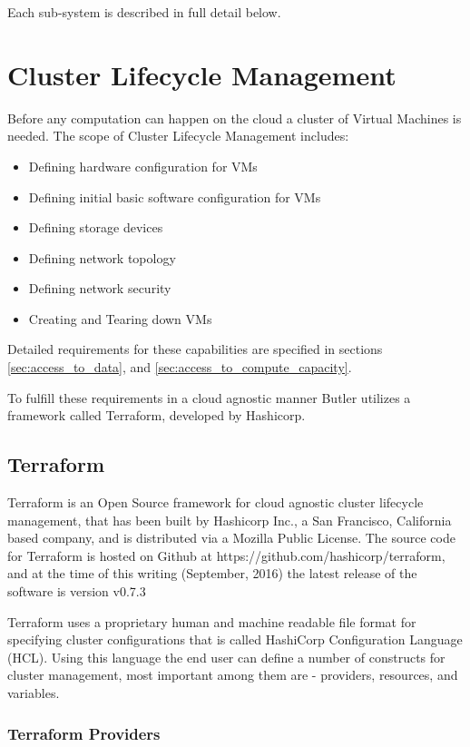 Each sub-system is described in full detail below.

\section{Cluster Lifecycle Management}

Before any computation can happen on the cloud a cluster of Virtual Machines is needed. The scope of Cluster Lifecycle Management includes:

\begin{itemize}
\item Defining hardware configuration for VMs
\item Defining initial basic software configuration for VMs
\item Defining storage devices
\item Defining network topology
\item Defining network security
\item Creating and Tearing down VMs
\end{itemize}

Detailed requirements for these capabilities are specified in sections \ref{sec:access_to_data}, and \ref{sec:access_to_compute_capacity}.

To fulfill these requirements in a cloud agnostic manner Butler utilizes a framework called Terraform, developed by Hashicorp.

\subsection{Terraform}\label{sec:terraform_design}

Terraform is an Open Source framework for cloud agnostic cluster lifecycle management, that has been built by Hashicorp Inc., a San Francisco, California based company, and is distributed via a Mozilla Public License. The source code for Terraform is hosted on Github at https://github.com/hashicorp/terraform, and at the time of this writing (September, 2016) the latest release of the software is version v0.7.3

Terraform uses a proprietary human and machine readable file format for specifying cluster configurations that is called HashiCorp Configuration Language (HCL). Using this language the end user can define a number of constructs for cluster management, most important among them are - providers, resources, and variables.

\subsubsection {Terraform Providers}

